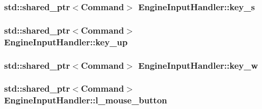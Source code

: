 \subsubsection[{key\+\_\+s}]{\setlength{\rightskip}{0pt plus 5cm}std\+::shared\+\_\+ptr$<${\bf Command}$>$ Engine\+Input\+Handler\+::key\+\_\+s\hspace{0.3cm}{\ttfamily [private]}}\label{class_engine_input_handler_ac8cb7f400955f76a2258a64f0812c309}
\hypertarget{class_engine_input_handler_a325f37f96aee129b9fc375c7a784798e}{}
\subsubsection[{key\+\_\+up}]{\setlength{\rightskip}{0pt plus 5cm}std\+::shared\+\_\+ptr$<${\bf Command}$>$ Engine\+Input\+Handler\+::key\+\_\+up\hspace{0.3cm}{\ttfamily [private]}}\label{class_engine_input_handler_a325f37f96aee129b9fc375c7a784798e}
\hypertarget{class_engine_input_handler_adc4f776b64656ce3b549a1efcbba5dfb}{}
\subsubsection[{key\+\_\+w}]{\setlength{\rightskip}{0pt plus 5cm}std\+::shared\+\_\+ptr$<${\bf Command}$>$ Engine\+Input\+Handler\+::key\+\_\+w\hspace{0.3cm}{\ttfamily [private]}}\label{class_engine_input_handler_adc4f776b64656ce3b549a1efcbba5dfb}
\hypertarget{class_engine_input_handler_a1d5d91670520e1424bf5dac389d65069}{}
\subsubsection[{l\+\_\+mouse\+\_\+button}]{\setlength{\rightskip}{0pt plus 5cm}std\+::shared\+\_\+ptr$<${\bf Command}$>$ Engine\+Input\+Handler\+::l\+\_\+mouse\+\_\+button\hspace{0.3cm}{\ttfamily [private]}}\label{class_engine_input_handler_a1d5d91670520e1424bf5dac389d65069}
\hypertarget{class_engine_input_handler_ae534eb94ba995a38f87faf37ed309ba5}{}
